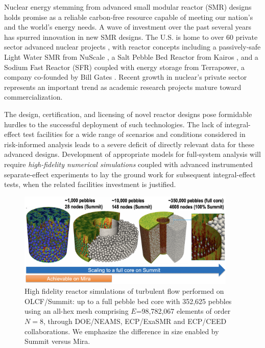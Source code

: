 


Nuclear energy stemming from advanced small modular reactor (SMR) designs
holds promise as a reliable carbon-free resource capable of meeting our
nation's and the world's energy needs.  A wave of investment over the past
several years has spurred innovation in new SMR designs.
The U.S. is home to over 60 private sector advanced nuclear projects \cite{third_way},
with reactor concepts including a passively-safe Light Water SMR from NuScale \cite{nuscale},
a Salt Pebble Bed Reactor from Kairos \cite{kairos},
and a Sodium Fast Reactor (SFR) coupled with energy storage from Terrapower,
a company co-founded by Bill Gates \cite{natrium}. Recent growth in nuclear's private
sector represents an important trend as academic research projects mature
toward commercialization.

The design, certification, and licensing of novel reactor designs pose
formidable hurdles to the successful deployment of such technologies.
The lack of integral-effect test facilities for a wide range of scenarios and
conditions considered in risk-informed analysis leads to a severe deficit of
directly relevant data for these advanced designs.  Development of  appropriate
models for full-system analysis will require {\em high-fidelity numerical
simulations} coupled with advanced instrumented separate-effect experiments to
lay the ground work for subsequent integral-effect tests, when the related
facilities investment is justified.

\begin{figure}[!ht]
\centering
\includegraphics[width=0.93\textwidth]{figs/pebble01.png}
 \caption{\label{fig:350k} High fidelity reactor simulations of turbulent flow performed on OLCF/Summit:
  up to a full pebble bed core with 352,625 pebbles using an all-hex mesh comprising $E$=98,782,067 
  elements of order $N=8$, through DOE/NEAMS, ECP/ExaSMR and ECP/CEED collaborations.  
  We emphasize the difference in size enabled by Summit versus Mira.}
\end{figure}

